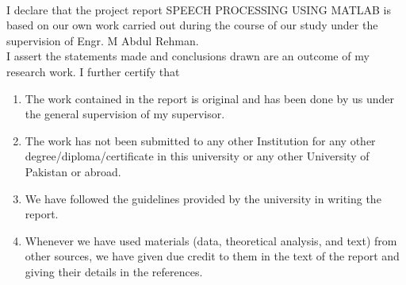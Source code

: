 


\begin{titlepage}
\begin{center}
 \\
\end{center}
  \vspace*{0.5cm}

I declare that the project report SPEECH PROCESSING USING MATLAB is based on our own work carried out during the course of our study under the supervision of Engr. M Abdul Rehman.\\
I assert the statements made and conclusions drawn are an
outcome of my research work. I further certify that\\[0.2cm]

\begin{enumerate}
\item  The work contained in the report is original and has been
done by us under the general supervision of my
supervisor.

\item The work has not been submitted to any other Institution
for any other degree/diploma/certificate in this university
or any other University of Pakistan or abroad.


\item We have followed the guidelines provided by the
university in writing the report.

\item Whenever we have used materials (data, theoretical
analysis, and text) from other sources, we have given due
credit to them in the text of the report and giving their
details in the references.

\end{enumerate}


\end{titlepage}

